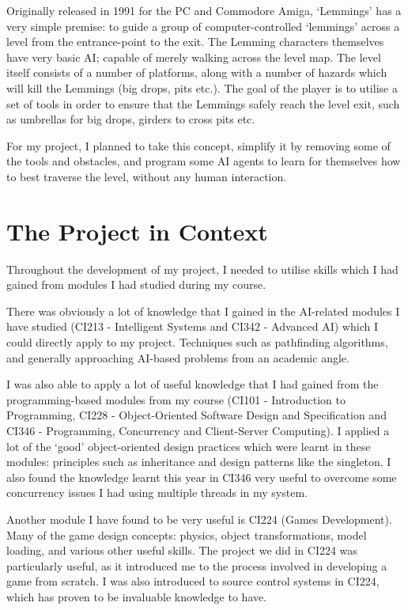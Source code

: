 \documentclass[a4paper,oneside]{report}
\begin{document}
Originally released in 1991 for the PC and Commodore Amiga, `Lemmings' has a very simple premise: to guide a group of computer-controlled `lemmings’ across a level from the entrance-point to the exit. The Lemming characters themselves have very basic AI; capable of merely walking across the level map. The level itself consists of a number of platforms, along with a number of hazards which will kill the Lemmings (big drops, pits etc.). The goal of the player is to utilise a set of tools in order to ensure that the Lemmings safely reach the level exit, such as umbrellas for big drops, girders to cross pits etc. 

For my project, I planned to take this concept, simplify it by removing some of the tools and obstacles, and program some AI agents to learn for themselves how to best traverse the level, without any human interaction.
		
\section{The Project in Context}
	
Throughout the development of my project, I needed to utilise skills which I had gained from modules I had studied during my course.

There was obviously a lot of knowledge that I gained in the AI-related modules I have studied (CI213 - Intelligent Systems and CI342 - Advanced AI) which I could directly apply to my project. Techniques such as pathfinding algorithms, and generally approaching AI-based problems from an academic angle.

I was also able to apply a lot of useful knowledge that I had gained from the programming-based modules from my course (CI101 - Introduction to Programming, CI228 - Object-Oriented Software Design and Specification and CI346 - Programming, Concurrency and Client-Server Computing). I applied a lot of the `good' object-oriented design practices which were learnt in these modules: principles such as inheritance and design patterns like the singleton. I also found the knowledge learnt this year in CI346 very useful to overcome some concurrency issues I had using multiple threads in my system.

Another module I have found to be very useful is CI224 (Games Development). Many of the game design concepts: physics, object transformations, model loading, and various other useful skills. The project we did in CI224 was particularly useful, as it introduced me to the process involved in developing a game from scratch. I was also introduced to source control systems in CI224, which has proven to be invaluable knowledge to have.
\end{document}
